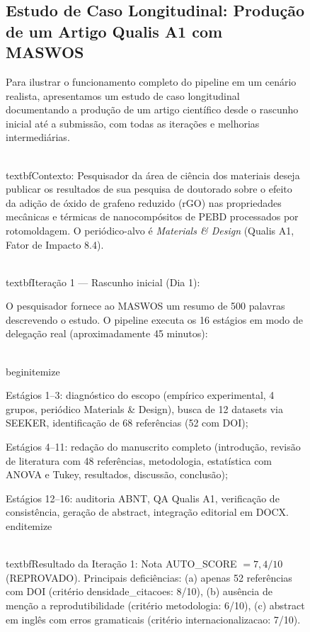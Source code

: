 \begin{figure}
\subsection{Estudo de Caso Longitudinal: Produção de um Artigo Qualis A1 com MASWOS}
\label{sec:caso_longitudinal}

Para ilustrar o funcionamento completo do pipeline em um cenário
realista, apresentamos um estudo de caso longitudinal
documentando a produção de um artigo científico desde o rascunho
inicial até a submissão, com todas as iterações e melhorias
intermediárias.

\\textbf{Contexto:} Pesquisador da área de ciência dos
materiais deseja publicar os resultados de sua pesquisa de
doutorado sobre o efeito da adição de óxido de grafeno reduzido
(rGO) nas propriedades mecânicas e térmicas de nanocompósitos de
PEBD processados por rotomoldagem. O periódico-alvo é
\textit{Materials \& Design} (Qualis A1, Fator de Impacto 8.4).

\\textbf{Iteração 1 — Rascunho inicial (Dia 1):}

O pesquisador fornece ao MASWOS um resumo de 500 palavras
descrevendo o estudo. O pipeline executa os 16 estágios em modo
de delegação real (aproximadamente 45 minutos):

\\begin{itemize}
    \item Estágios 1--3: diagnóstico do escopo (empírico
    experimental, 4 grupos, periódico Materials \& Design),
    busca de 12 datasets via SEEKER, identificação de 68
    referências (52 com DOI);

    \item Estágios 4--11: redação do manuscrito completo
    (introdução, revisão de literatura com 48 referências,
    metodologia, estatística com ANOVA e Tukey, resultados,
    discussão, conclusão);

    \item Estágios 12--16: auditoria ABNT, QA Qualis A1,
    verificação de consistência, geração de abstract,
    integração editorial em DOCX.
\\end{itemize}

\\textbf{Resultado da Iteração 1:} Nota AUTO\_SCORE
$= 7,4/10$ (REPROVADO). Principais deficiências: (a) apenas 52
referências com DOI (critério densidade\_citacoes: 8/10),
(b) ausência de menção a reprodutibilidade (critério metodologia:
6/10), (c) abstract em inglês com erros gramaticais (critério
internacionalizacao: 7/10).


\end{figure}

